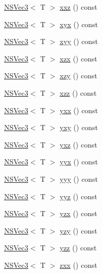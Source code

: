 \begin{DoxyCompactItemize}
\item 
\hyperlink{structNSVec3}{N\-S\-Vec3}$<$ T $>$ \hyperlink{structNSVec3_a03ac0590a40a5bddd29232cf0b065d66}{xxz} () const 
\item 
\hyperlink{structNSVec3}{N\-S\-Vec3}$<$ T $>$ \hyperlink{structNSVec3_a7b0c11a0066fdce6a3c39f4b0d800a80}{xyx} () const 
\item 
\hyperlink{structNSVec3}{N\-S\-Vec3}$<$ T $>$ \hyperlink{structNSVec3_ab77eb8f1158cd035f5fce39ffde565ea}{xyy} () const 
\item 
\hyperlink{structNSVec3}{N\-S\-Vec3}$<$ T $>$ \hyperlink{structNSVec3_ac55c7c928604c03e8c173d2c18c1968a}{xzx} () const 
\item 
\hyperlink{structNSVec3}{N\-S\-Vec3}$<$ T $>$ \hyperlink{structNSVec3_a20ba81352401e56c4e42e0a7cb131a71}{xzy} () const 
\item 
\hyperlink{structNSVec3}{N\-S\-Vec3}$<$ T $>$ \hyperlink{structNSVec3_af567ebe11d835ad34cf5c2f760e7cc7a}{xzz} () const 
\item 
\hyperlink{structNSVec3}{N\-S\-Vec3}$<$ T $>$ \hyperlink{structNSVec3_ad78741922485528895d53d67ab47487b}{yxx} () const 
\item 
\hyperlink{structNSVec3}{N\-S\-Vec3}$<$ T $>$ \hyperlink{structNSVec3_af176d21dd70cec9f873301a07b90f2b4}{yxy} () const 
\item 
\hyperlink{structNSVec3}{N\-S\-Vec3}$<$ T $>$ \hyperlink{structNSVec3_a4b1a91b84971d1c066594bc6570da4a5}{yxz} () const 
\item 
\hyperlink{structNSVec3}{N\-S\-Vec3}$<$ T $>$ \hyperlink{structNSVec3_ad843b15db76b5414a1e4e0c9c2a3ee0a}{yyx} () const 
\item 
\hyperlink{structNSVec3}{N\-S\-Vec3}$<$ T $>$ \hyperlink{structNSVec3_a9113462f4942faf5dec6e3946e1a6945}{yyy} () const 
\item 
\hyperlink{structNSVec3}{N\-S\-Vec3}$<$ T $>$ \hyperlink{structNSVec3_a665667f62ed35325ff6c9adf8dbb3f3d}{yyz} () const 
\item 
\hyperlink{structNSVec3}{N\-S\-Vec3}$<$ T $>$ \hyperlink{structNSVec3_a7adae94134532f1e8636fc8b4e122bf1}{yzx} () const 
\item 
\hyperlink{structNSVec3}{N\-S\-Vec3}$<$ T $>$ \hyperlink{structNSVec3_a58b9842d9c68967b488001e5b92bc451}{yzy} () const 
\item 
\hyperlink{structNSVec3}{N\-S\-Vec3}$<$ T $>$ \hyperlink{structNSVec3_a07b97eff9e3ab8da136a650e0bd33440}{yzz} () const 
\item 
\hyperlink{structNSVec3}{N\-S\-Vec3}$<$ T $>$ \hyperlink{structNSVec3_a4998e5cf89c5a7318cd7545f34985a5d}{zxx} () const 

\end{DoxyCompactItemize}
